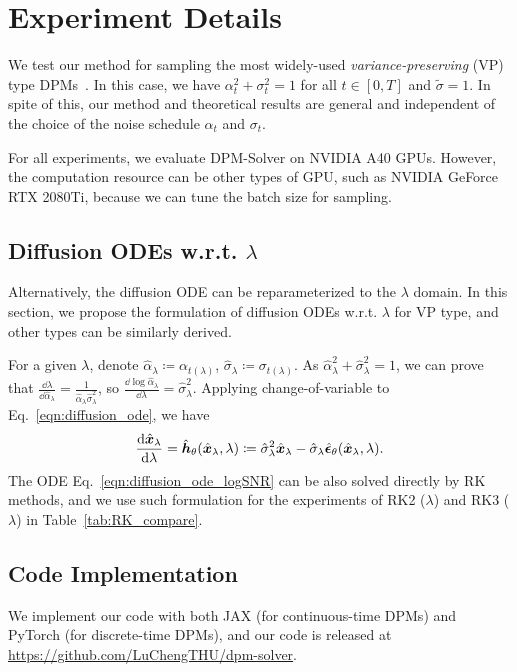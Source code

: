 
\section{Experiment Details}
\label{appendix:experiment}

We test our method for sampling the most widely-used \textit{variance-preserving} (VP) type  DPMs~\citep{sohl2015deep,ho2020denoising}. 
In this case, we have $\alpha_t^2+\sigma_t^2=1$ for all $t\in[0,T]$ and $\tilde\sigma=1$. In spite of this, our method and theoretical results are general and independent of the choice of the noise schedule $\alpha_t$ and $\sigma_t$. 

For all experiments, we evaluate DPM-Solver on NVIDIA A40 GPUs. However, the computation resource can be other types of GPU, such as NVIDIA GeForce RTX 2080Ti, because we can tune the batch size for sampling.

\subsection{Diffusion ODEs w.r.t. $\lambda$}
\label{appendix:RK}
Alternatively, the diffusion ODE can be reparameterized to the $\lambda$ domain. In this section, we propose the formulation of diffusion ODEs w.r.t. $\lambda$ for VP type, and other types can be similarly derived.

For a given $\lambda$, denote $\hat\alpha_{\lambda}\coloneqq \alpha_{t(\lambda)}$, $\hat\sigma_{\lambda}\coloneqq \sigma_{t(\lambda)}$. As $\hat\alpha_{\lambda}^2 + \hat\sigma_{\lambda}^2 = 1$, we can prove that $\frac{\dd\lambda}{\dd\hat\alpha_{\lambda}}=\frac{1}{\hat\alpha_{\lambda}\hat\sigma^2_{\lambda}}$, so $\frac{\dd\log \hat\alpha_{\lambda}}{\dd \lambda}=\hat\sigma^2_{\lambda}$. Applying change-of-variable to Eq.~\eqref{eqn:diffusion_ode}, we have
\begin{equation}
\label{eqn:diffusion_ode_logSNR}
    \frac{\dd\hat{\bm{x}}_\lambda}{\dd\lambda} = \hat{\bm{h}}_\theta(\hat{\bm{x}}_\lambda,\lambda)\coloneqq \hat\sigma_\lambda^2 \hat{\bm{x}}_\lambda - \hat\sigma_\lambda \hat{\bm{\epsilon}}_\theta(\hat{\bm{x}}_\lambda,\lambda).
\end{equation}
The ODE Eq.~\eqref{eqn:diffusion_ode_logSNR} can be also solved directly by RK methods, and we use such formulation for the experiments of RK2 ($\lambda$) and RK3 ($\lambda$) in Table~\ref{tab:RK_compare}.

\subsection{Code Implementation}
We implement our code with both JAX (for continuous-time DPMs) and PyTorch (for discrete-time DPMs), and our code is released at \url{https://github.com/LuChengTHU/dpm-solver}.

